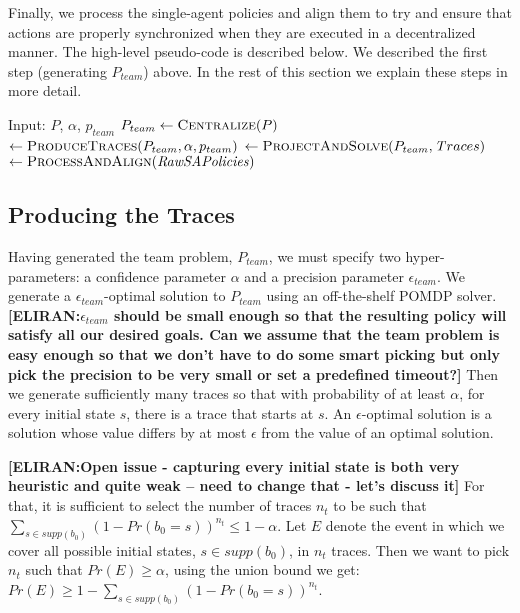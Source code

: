 \documentclass[letterpaper]{article} %
\newcommand{\eliran}[1]{\textbf{[\color{red}ELIRAN:#1]}}
\newcommand{\guy}[1]{\textbf{[\color{orange}GUY:#1]}}
\begin{document}
Finally, we process the single-agent policies and align them to try and ensure that actions are properly synchronized when they are executed in a decentralized manner. The high-level pseudo-code is described below. We described the first step (generating $P_{team}$) above. In the rest of this section we explain these steps in more detail.

\begin{algorithm}
\caption{GenerateAgentPolicies \guy{This pseudo code is pretty useless. It just lists the phases. I don't think that it adds anything.}\eliran{drop it?}\guy{Or provide the implementation of each step}\eliran{except for centralize, the steps are all the other pseudo codes}}
\begin{algorithmic}[tbph]
\State Input: $P$, $\alpha$, $p_{team}$
\State $P_{team} \gets \Call{Centralize}{P}$
 $\gets \Call{ProduceTraces}{P_{team}, \alpha, p_{team}}$
$ \gets \Call{ProjectAndSolve}{P_{team},{\mathit Traces}}$
 $\gets \Call{ProcessAndAlign}{\mathit{RawSAPolicies}}$
\end{algorithmic}
\end{algorithm}

\subsection{Producing the Traces}

Having generated the team problem, $P_{team}$, we 
must specify two hyper-parameters: a confidence parameter $\alpha$ and a precision parameter $\epsilon_{team}$. We generate a $\epsilon_{team}$-optimal solution
to $P_{team}$ using an off-the-shelf POMDP solver. \eliran{$\epsilon_{team}$ should be small enough so that the resulting policy will satisfy all \textbf{our} desired goals. Can we assume that the team problem is easy enough so that we don't have to do some smart picking but only pick the precision to be very small or set a predefined timeout?}
Then we generate sufficiently many traces so that with probability of at least $\alpha$, for every initial state $s$, there is a trace that starts at $s$. An $\epsilon$-optimal solution is a solution whose value differs by at most $\epsilon$ from the value of an optimal solution.

\eliran{Open issue - capturing every initial state is both very heuristic and quite weak -- need to change that - let's discuss it}
For that, it is sufficient to select the number of traces $n_t$ to be such that $\sum_{s\in supp(b_0)}(1-Pr(b_0=s))^{n_t} \leq 1-\alpha$.
Let $E$ denote the event in which we cover all possible initial states, $s \in supp(b_0)$, in $n_t$ traces. Then we want to pick $n_t$ such that $Pr(E)\geq \alpha$, using the union bound we get: $Pr(E)\geq 1-\sum_{s\in supp(b_0)}(1-Pr(b_0=s))^{n_t}$.
\end{document}
